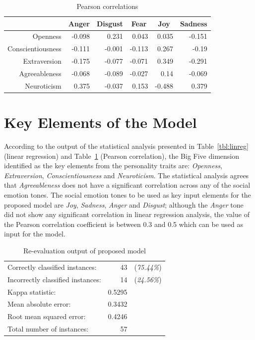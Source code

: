 \documentclass[graybox]{svmult}
\begin{document}
{{{\begin{table}[!ht]
\centering
\begin{tabular}{@{}rrrrrr@{}}
\toprule
                  & \multicolumn{1}{c}{Anger}  & \multicolumn{1}{c}{Disgust} & \multicolumn{1}{c}{Fear}   & \multicolumn{1}{c}{Joy}    & \multicolumn{1}{c}{Sadness} \\ 
\midrule
Openness          & -0.098 & 0.231   & 0.043  & 0.035  & -0.151  \\
Conscientiousness & -0.111 & -0.001  & -0.113 & 0.267  & -0.19   \\
Extraversion      & -0.175 & -0.077  & -0.071 & 0.349  & -0.291  \\
Agreeableness     & -0.068 & -0.089  & -0.027 & 0.14   & -0.069  \\
Neuroticism       & 0.375  & -0.037  & 0.153  & -0.488 & 0.379   \\ 

\bottomrule
\end{tabular}
\caption{Pearson correlations}
\label{tab:pearson}
\end{table}


\section{Key Elements of the Model}\label{model}

According to the output of the statistical analysis presented in
Table~\ref{tbl:linreg} (linear regression) and Table~\ref{tab:pearson}
(Pearson correlation), the Big Five dimension identified as the key
elements from the personality traits are: {\emph{Openness}},
{\emph{Extraversion}}, {\emph{Conscientiousness}} and
{\emph{Neuroticism}}. The statistical analysis agrees that
{\emph{Agreeableness}} does not have a significant correlation across
any of the social emotion tones. The social emotion tones to be used
as key input elements for the proposed model are {\emph{Joy}},
{\emph{Sadness}}, {\emph{Anger}} and {\emph{Disgust}}; although the
{\emph{Anger}} tone did not show any significant correlation in linear
regression analysis, the value of the Pearson correlation coefficient
is between 0.3 and 0.5 which can be used as input for the model.

\begin{table}[!ht]
\centering
\begin{tabular}{lrr}
Correctly classified instances:   & 43     & ({\emph{75.44\%}}) \\
Incorrectly classified instances: & 14     & ({\emph{24.56\%}}) \\
Kappa statistic:                  & 0.5295 &         \\
Mean absolute error:              & 0.3432 &         \\
Root mean squared error:          & 0.4246 &         \\
Total number of instances:        & 57     &        
\end{tabular}
\caption{Re-evaluation output of proposed model}
\label{tab:reeval}
\end{table}

}}}
\end{document}
